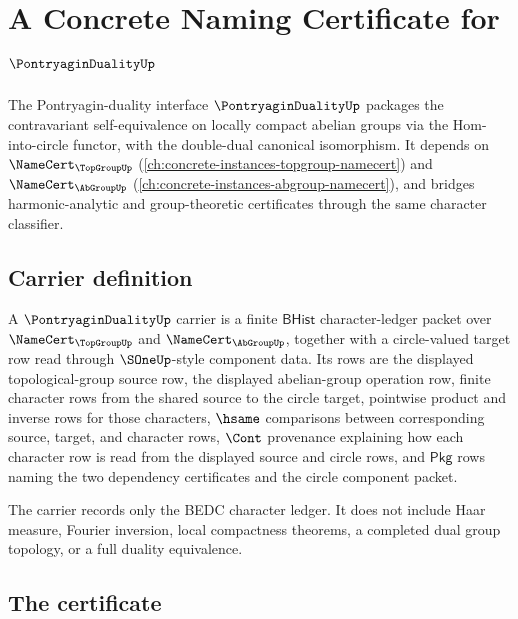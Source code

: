 \chapter{A Concrete Naming Certificate for $\PontryaginDualityUp$}
\label{ch:concrete-instances-pontryaginduality-namecert}

The Pontryagin-duality interface $\PontryaginDualityUp$ packages the contravariant self-equivalence on locally compact abelian groups via the Hom-into-circle functor, with the double-dual canonical isomorphism. It depends on $\NameCert_{\TopGroupUp}$ (\autoref{ch:concrete-instances-topgroup-namecert}) and $\NameCert_{\AbGroupUp}$ (\autoref{ch:concrete-instances-abgroup-namecert}), and bridges harmonic-analytic and group-theoretic certificates through the same character classifier.

\section{Carrier definition}
\label{sec:pontryaginduality-carrier}

\begin{definition}
\label{def:pontryaginduality-character-carrier}
A $\PontryaginDualityUp$ carrier is a finite $\mathsf{BHist}$
character-ledger packet over $\NameCert_{\TopGroupUp}$ and
$\NameCert_{\AbGroupUp}$, together with a circle-valued target row read through
$\SOneUp$-style component data. Its rows are the displayed topological-group
source row, the displayed abelian-group operation row, finite character rows
from the shared source to the circle target, pointwise product and inverse
rows for those characters, $\hsame$ comparisons between corresponding source,
target, and character rows, $\Cont$ provenance explaining how each character
row is read from the displayed source and circle rows, and $\mathsf{Pkg}$ rows
naming the two dependency certificates and the circle component packet.

The carrier records only the BEDC character ledger. It does not include Haar
measure, Fourier inversion, local compactness theorems, a completed dual group
topology, or a full duality equivalence.
\end{definition}

\section{The certificate}
\label{sec:pontryaginduality-certificate}

